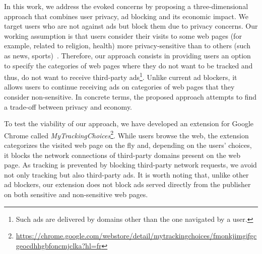 \documentclass[conference]{IEEEtran}
\begin{document}
In this work, we address the evoked concerns by proposing a three-dimensional approach that combines user privacy, ad blocking and its economic impact.
We target users who are not against ads but block them due to privacy concerns.
Our working assumption is that users consider their visits to some web pages (for example, related to religion, health) more privacy-sensitive than to others (such as news, sports)~\cite{Leon_2013,chanchary2015user}.
Therefore, our approach consists in providing users an option to specify the categories of web pages where they do not want to be tracked and thus, do not want to receive third-party ads\footnote{Such ads are delivered by domains other than the one navigated by a user.}.
Unlike current ad blockers, it allows users to continue receiving ads on categories of web pages that they consider non-sensitive.
In concrete terms, the proposed approach attempts to find a trade-off between privacy and economy.



To test the viability of our approach, we have developed an extension for Google Chrome called \emph{MyTrackingChoices}\footnote{\url{https://chrome.google.com/webstore/detail/mytrackingchoices/fmonkjimgifgcgeocdhhgbfoncmjclka?hl=fr}}. While users browse the web, the extension categorizes the visited web page on the fly and, 
depending on the users' choices, it blocks the network connections of third-party domains present on the web page.
As tracking is prevented by blocking third-party network requests, we avoid not only tracking but also third-party ads.
It is worth noting that, unlike other ad blockers, our extension does not block ads served directly from the publisher on both sensitive and non-sensitive web pages.
\end{document}
